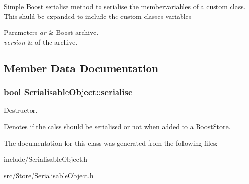 Simple Boost serialise method to serialise the membervariables of a custom class. This shuld be expanded to include the custom classes variables 
\begin{DoxyParams}{Parameters}
{\em ar} & Boost archive. \\
\hline
{\em version} & of the archive. \\
\hline
\end{DoxyParams}


\subsection{Member Data Documentation}
\hypertarget{classSerialisableObject_a4635f9e80623df463bcca2c88b10fc67}{
\subsubsection[{serialise}]{\setlength{\rightskip}{0pt plus 5cm}bool Serialisable\-Object\-::serialise}}\label{classSerialisableObject_a4635f9e80623df463bcca2c88b10fc67}


Destructor. 

Denotes if the calss should be serialised or not when added to a \hyperlink{classBoostStore}{Boost\-Store}. 

The documentation for this class was generated from the following files\-:\begin{DoxyCompactItemize}
\item 
include/Serialisable\-Object.\-h\item 
src/\-Store/Serialisable\-Object.\-h\end{DoxyCompactItemize}
